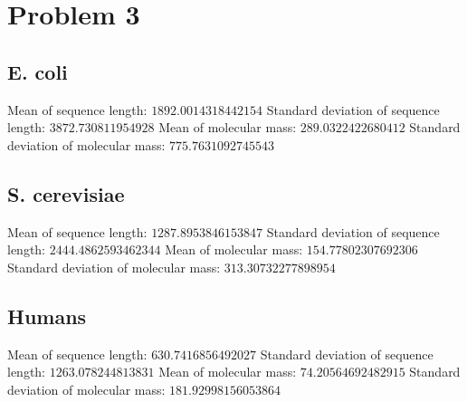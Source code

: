 \documentclass{article}
\begin{document}
\section{Problem 3}
\subsection{E. coli}
Mean of sequence length: $1892.0014318442154$ \newline
Standard deviation of sequence length: $3872.730811954928$ \newline
Mean of molecular mass: $289.0322422680412$ \newline
Standard deviation of molecular mass: $775.7631092745543$ \newline


\setlength{\voffset}{0cm}
\setlength{\hoffset}{0cm}



\setlength{\voffset}{-2.54cm}
\setlength{\hoffset}{-2.54cm}
\setlength{\voffset}{0cm}
\setlength{\hoffset}{0cm}



\setlength{\voffset}{-2.54cm}
\setlength{\hoffset}{-2.54cm}
% 
\subsection{S. cerevisiae}
Mean of sequence length: $1287.8953846153847$ \newline
Standard deviation of sequence length: $2444.4862593462344$ \newline
Mean of molecular mass: $154.77802307692306$ \newline
Standard deviation of molecular mass: $313.30732277898954$ \newline

\setlength{\voffset}{0cm}
\setlength{\hoffset}{0cm}



\setlength{\voffset}{-2.54cm}
\setlength{\hoffset}{-2.54cm}
\setlength{\voffset}{0cm}
\setlength{\hoffset}{0cm}



\setlength{\voffset}{-2.54cm}
\setlength{\hoffset}{-2.54cm}
\subsection{Humans}
Mean of sequence length: $630.7416856492027$ \newline
Standard deviation of sequence length: $1263.078244813831$ \newline
Mean of molecular mass: $74.20564692482915$ \newline
Standard deviation of molecular mass: \newline $181.92998156053864$
\setlength{\voffset}{0cm}
\setlength{\hoffset}{0cm}
\end{document}
